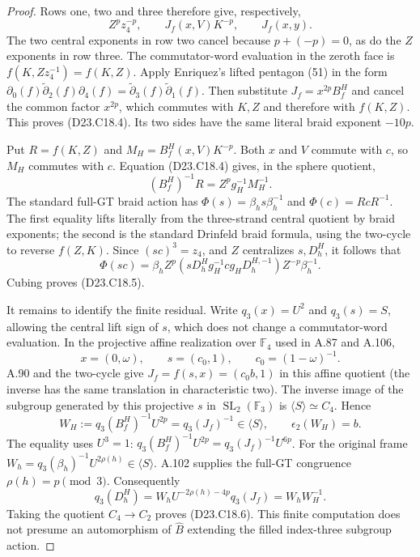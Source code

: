 \begin{proof}
Rows one, two and three therefore give, respectively,
\[
 Z^p z_4^{-p},\qquad J_f(x,V)K^{-p},\qquad J_f(x,y).
\]
The two central exponents in row two cancel because
$p+(-p)=0$, as do the $Z$ exponents in row three.
The commutator-word evaluation in the zeroth face is
$f(K,Zz_4^{-1})=f(K,Z)$.
Apply Enriquez's lifted pentagon (51) in the form
$\partial_0(f)\widetilde\partial_2(f)\partial_4(f)
=\widetilde\partial_3(f)\widetilde\partial_1(f)$.
Then substitute $J_f=x^{2p}B^H_f$ and cancel the common
factor $x^{2p}$, which commutes with $K,Z$ and therefore
with $f(K,Z)$. This proves (D23.C18.4).
Its two sides have the same literal braid exponent $-10p$.

Put $R=f(K,Z)$ and $M_H=B^H_f(x,V)K^{-p}$.
Both $x$ and $V$ commute with $c$, so $M_H$ commutes with $c$.
Equation (D23.C18.4) gives, in the sphere quotient,
\[
       (B^H_f)^{-1}R=Z^p g_H^{-1}M_H^{-1}.
\]
The standard full-GT braid action has
$\Phi(s)=\beta_hs\beta_h^{-1}$ and
$\Phi(c)=RcR^{-1}$. The first equality lifts literally
from the three-strand central quotient by braid exponents;
the second is the standard Drinfeld braid formula, using
the two-cycle to reverse $f(Z,K)$.
Since $(sc)^3=z_4$, and $Z$ centralizes $s,D^H_h$, it follows
that
\[
 \Phi(sc)=\beta_h Z^p
  (sD^H_hg_H^{-1}c g_HD^{H,-1}_h)Z^{-p}\beta_h^{-1}.
\]
Cubing proves (D23.C18.5).

It remains to identify the finite residual. Write
$q_3(x)=U^2$ and $q_3(s)=S$, allowing the central lift sign
of $s$, which does not change a commutator-word evaluation.
In the projective affine realization over $\mathbb F_4$ used
in A.87 and A.106,
\[
 x=(0,\omega),\qquad s=(c_0,1),\qquad
 c_0=(1-\omega)^{-1}.
\]
A.90 and the two-cycle give
$J_f=f(s,x)=(c_0b,1)$ in this affine quotient (the inverse
has the same translation in characteristic two).
The inverse image of the subgroup generated by this projective
$s$ in $\operatorname{SL}_2(\mathbb F_3)$ is
$\langle S\rangle\simeq C_4$. Hence
\[
 W_H:=q_3(B^H_f)^{-1}U^{2p}
     =q_3(J_f)^{-1}\in\langle S\rangle,
       \qquad \epsilon_2(W_H)=b.
\]
The equality uses $U^3=1$:
$q_3(B^H_f)^{-1}U^{2p}=q_3(J_f)^{-1}U^{6p}$.
For the original frame
$W_h=q_3(\beta_h)^{-1}U^{2\rho(h)}\in\langle S\rangle$.
A.102 supplies the full-GT congruence $\rho(h)=p\pmod3$.
Consequently
\[
 q_3(D^H_h)
   =W_hU^{-2\rho(h)-4p}q_3(J_f)
   =W_h W_H^{-1}.
\]
Taking the quotient $C_4\to C_2$ proves (D23.C18.6).
This finite computation does not presume an automorphism of
$\widehat B$ extending the filled index-three subgroup action.
\end{proof}

